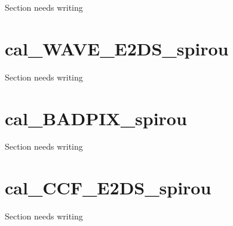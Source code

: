 Section needs writing

\section{cal\_WAVE\_E2DS\_spirou}
\label{section:qc_cal_WAVE_E2DS_spirou}

Section needs writing

\section{cal\_BADPIX\_spirou}
\label{section:qc_cal_BADPIX_spirou}

Section needs writing

\section{cal\_CCF\_E2DS\_spirou}
\label{section:qc_cal_CCF_E2DS_spirou}

Section needs writing


